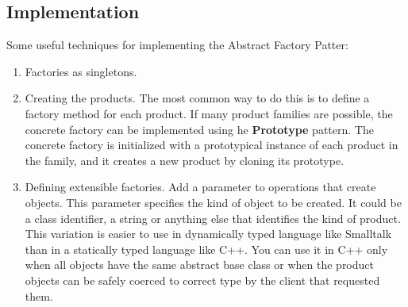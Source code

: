 \documentclass[11pt, a4paper]{book}
\begin{document}
\subsection{Implementation}
Some useful techniques for implementing the Abstract Factory Patter:
\begin{enumerate}
    \item Factories as singletons.
    \item Creating the products. The most common way to do this is to define a
    factory method for each product. If many product families are possible, the
    concrete factory can be implemented using he \textbf{Prototype} pattern. The
    concrete factory is initialized with a prototypical instance of each product
    in the family, and it creates a new product by cloning its prototype.
    \item Defining extensible factories. Add a parameter to operations that
    create objects. This parameter specifies the kind of object to be created.
    It could be a class identifier, a string or anything else that identifies
    the kind of product. This variation is easier to use in dynamically typed
    language like Smalltalk than in a statically typed language like C++. You
    can use it in C++ only when all objects have the same abstract base class or
    when the product objects can be safely coerced to correct type by the
    client that requested them.
\end{enumerate}
\end{document}
